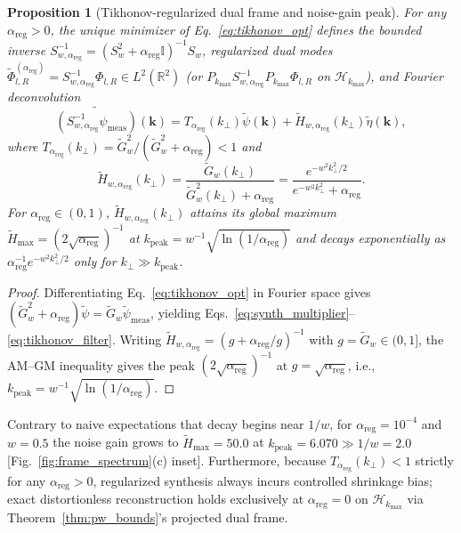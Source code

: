 \documentclass[aps,pra,reprint,amsmath,amssymb,floatfix,longbibliography]{revtex4-2}
\newtheorem{proposition}{Proposition}
\begin{document}
\begin{proposition}[Tikhonov-regularized dual frame and noise-gain peak]
\label{prop:tikhonov_dual}
For any $\alpha_{\mathrm{reg}} > 0$, the unique minimizer of Eq.~\eqref{eq:tikhonov_opt} defines the bounded inverse $S_{w,\alpha_{\mathrm{reg}}}^{-1} = (S_w^2 + \alpha_{\mathrm{reg}}\mathbb{I})^{-1}S_w$, regularized dual modes $\widetilde{\Phi}_{l,R}^{(\alpha_{\mathrm{reg}})} = S_{w,\alpha_{\mathrm{reg}}}^{-1}\Phi_{l,R} \in L^2(\mathbb{R}^2)$ (or $P_{k_{\max}}S_{w,\alpha_{\mathrm{reg}}}^{-1}P_{k_{\max}}\Phi_{l,R}$ on $\mathcal{H}_{k_{\max}}$), and Fourier deconvolution
\begin{equation}
\widetilde{(S_{w,\alpha_{\mathrm{reg}}}^{-1}\psi_{\mathrm{meas}})}(\mathbf{k}) = T_{\alpha_{\mathrm{reg}}}(k_\perp)\widetilde{\psi}(\mathbf{k}) + \widetilde{H}_{w,\alpha_{\mathrm{reg}}}(k_\perp)\widetilde{\eta}(\mathbf{k}),
\label{eq:synth_multiplier}
\end{equation}
where $T_{\alpha_{\mathrm{reg}}}(k_\perp) = \widetilde{G}_w^2/(\widetilde{G}_w^2 + \alpha_{\mathrm{reg}}) < 1$ and
\begin{equation}
\widetilde{H}_{w,\alpha_{\mathrm{reg}}}(k_\perp) = \frac{\widetilde{G}_w(k_\perp)}{\widetilde{G}_w^2(k_\perp) + \alpha_{\mathrm{reg}}} = \frac{e^{-w^2 k_\perp^2/2}}{e^{-w^2 k_\perp^2} + \alpha_{\mathrm{reg}}}.
\label{eq:tikhonov_filter}
\end{equation}
For $\alpha_{\mathrm{reg}} \in (0,1)$, $\widetilde{H}_{w,\alpha_{\mathrm{reg}}}(k_\perp)$ attains its global maximum $\widetilde{H}_{\max} = (2\sqrt{\alpha_{\mathrm{reg}}})^{-1}$ at $k_{\mathrm{peak}} = w^{-1}\sqrt{\ln(1/\alpha_{\mathrm{reg}})}$ and decays exponentially as $\alpha_{\mathrm{reg}}^{-1}e^{-w^2 k_\perp^2/2}$ only for $k_\perp \gg k_{\mathrm{peak}}$.
\end{proposition}
\begin{proof}
Differentiating Eq.~\eqref{eq:tikhonov_opt} in Fourier space gives $(\widetilde{G}_w^2 + \alpha_{\mathrm{reg}})\widetilde{\psi} = \widetilde{G}_w\widetilde{\psi}_{\mathrm{meas}}$, yielding Eqs.~\eqref{eq:synth_multiplier}--\eqref{eq:tikhonov_filter}. Writing $\widetilde{H}_{w,\alpha_{\mathrm{reg}}} = (g + \alpha_{\mathrm{reg}}/g)^{-1}$ with $g = \widetilde{G}_w \in (0,1]$, the AM--GM inequality gives the peak $(2\sqrt{\alpha_{\mathrm{reg}}})^{-1}$ at $g = \sqrt{\alpha_{\mathrm{reg}}}$, i.e., $k_{\mathrm{peak}} = w^{-1}\sqrt{\ln(1/\alpha_{\mathrm{reg}})}$.
\end{proof}

Contrary to naive expectations that decay begins near $1/w$, for $\alpha_{\mathrm{reg}} = 10^{-4}$ and $w = 0.5$ the noise gain grows to $\widetilde{H}_{\max} = 50.0$ at $k_{\mathrm{peak}} = 6.070 \gg 1/w = 2.0$ [Fig.~\ref{fig:frame_spectrum}(c) inset]. Furthermore, because $T_{\alpha_{\mathrm{reg}}}(k_\perp) < 1$ strictly for any $\alpha_{\mathrm{reg}} > 0$, regularized synthesis always incurs controlled shrinkage bias; exact distortionless reconstruction holds exclusively at $\alpha_{\mathrm{reg}} = 0$ on $\mathcal{H}_{k_{\max}}$ via Theorem~\ref{thm:pw_bounds}'s projected dual frame.
\end{document}
